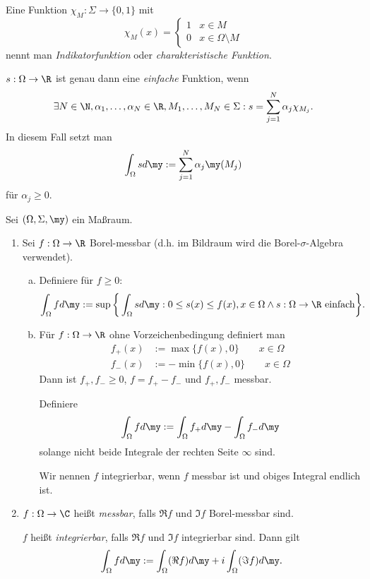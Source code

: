 \begin{df*}
	Eine Funktion $\chi_M: \Sigma \to \{0,1\}$ mit
	\[
		\chi_M (x) = \begin{cases}
			1 & x\in M \\
			0 & x \in \Omega \setminus M
		\end{cases}
	\]
	nennt man \emph{Indikatorfunktion} oder \emph{charakteristische Funktion}.

	$s:\Omega \to \R$ ist genau dann eine \emph{einfache} Funktion, wenn
	\[
		\exists N \in \N, \alpha_1, \dotsc, \alpha_N \in \R, M_1, \dotsc, M_N \in \Sigma : s = \sum_{j=1}^N \alpha_j \chi_{M_j}.
	\]
	In diesem Fall setzt man
	\[
		\int_{\Omega} s d\my := \sum_{j=1}^N \alpha_j \my(M_j)
	\]
	für $\alpha_j \ge 0$.
\end{df*}

\begin{df}
	Sei $(\Omega, \Sigma, \my)$ ein Maßraum.
	
	\begin{enumerate}[1)]
		\item
			Sei $f: \Omega \to \R$ Borel-messbar (d.h. im Bildraum wird die Borel-$\sigma$-Algebra verwendet).

			\begin{enumerate}[a)]
				\item
					Definiere für $f \ge 0$:
					\[
						\int_{\Omega} f d\my 
						:= \sup \bigg\{ \int_{\Omega} s d\my : 0 \le s(x) \le f(x), x \in \Omega \land s : \Omega \to \R \text{ einfach} \bigg\}.
					\]
				\item
					Für $f: \Omega \to \R$ ohne Vorzeichenbedingung definiert man
					\begin{align*}
						f_+ (x) &:= \max\{f(x), 0 \} \qquad x \in \Omega \\
						f_- (x) &:= -\min\{ f(x), 0 \} \qquad x \in \Omega
					\end{align*}
					Dann ist $f_+, f_- \ge 0$, $f = f_+ - f_-$ und $f_+, f_-$ messbar.
					
					Definiere
					\[
						\int_{\Omega} f d\my := \int_{\Omega} f_+ d\my - \int_{\Omega} f_- d\my
					\]
					solange nicht beide Integrale der rechten Seite $\infty$ sind.

					Wir nennen $f$ integrierbar, wenn $f$ messbar ist und obiges Integral endlich ist.
			\end{enumerate}
		\item
			$f : \Omega \to \C$ heißt \emph{messbar}, falls $\Re f$ und $\Im f$ Borel-messbar sind.

			$f$ heißt \emph{integrierbar}, falls $\Re f$ und $\Im f$ integrierbar sind. 
			Dann gilt
			\[
				\int_{\Omega} f d\my := \int_{\Omega} (\Re f) d\my + i \int_{\Omega} (\Im f) d\my .
			\]
	\end{enumerate}

\end{df}
	

